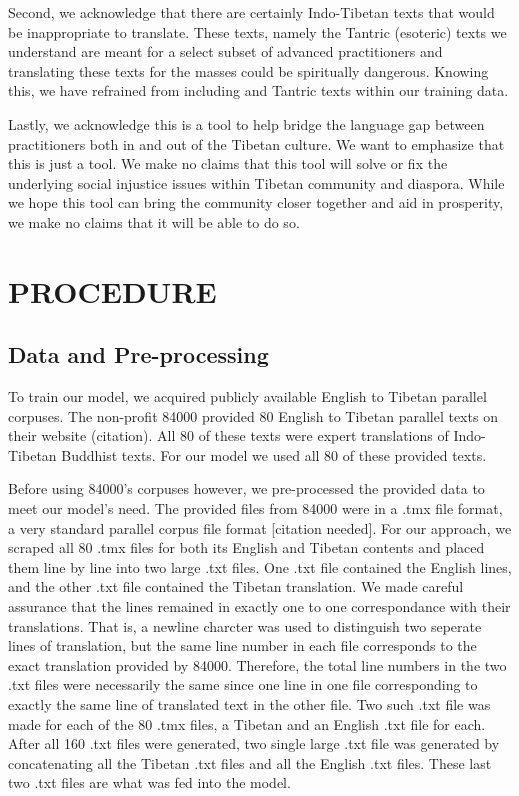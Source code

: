 \documentclass[letterpaper, 10 pt, conference]{ieeeconf}  %
\begin{document}
Second, we acknowledge that there are certainly Indo-Tibetan texts that would be inappropriate to translate. These texts, namely the Tantric (esoteric) texts we understand are meant for a select subset of advanced practitioners and translating these texts for the masses could be spiritually dangerous. Knowing this, we have refrained from including and Tantric texts within our training data.


Lastly, we acknowledge this is a tool to help bridge the language gap between practitioners both in and out of the Tibetan culture. We want to emphasize that this is just a tool. We make no claims that this tool will solve or fix the underlying social injustice issues within Tibetan community and diaspora. While we hope this tool can bring the community closer together and aid in prosperity, we make no claims that it will be able to do so. 

\section{PROCEDURE}



\subsection{Data and Pre-processing}

To train our model, we acquired publicly available English to Tibetan parallel corpuses. The non-profit 84000 provided 80 English to Tibetan parallel texts on their website (citation). All 80 of these texts were expert translations of Indo-Tibetan Buddhist texts. For our model we used all 80 of these provided texts.

Before using 84000's corpuses however, we pre-processed the provided data to meet our model's need. The provided files from 84000 were in a .tmx file format, a very standard parallel corpus file format [citation needed]. 
For our approach, we scraped all 80 .tmx files for both its English and Tibetan contents and placed them line by line into two large .txt files. One .txt file contained the English lines, and the other .txt file contained the Tibetan translation. We made careful assurance that the lines remained in exactly one to one correspondance with their translations. That is, a newline charcter was used to distinguish two seperate lines of translation, but the same line number in each file corresponds to the exact translation provided by 84000. Therefore, the total line numbers in the two .txt files were necessarily the same since one line in one file corresponding to exactly the same line of translated text in the other file. Two such .txt file was made for each of the 80 .tmx files, a Tibetan and an English .txt file for each. After all 160 .txt files were generated, two single large .txt file was generated by concatenating all the Tibetan .txt files and all the English .txt files. These last two .txt files are what was fed into the model.
\end{document}
